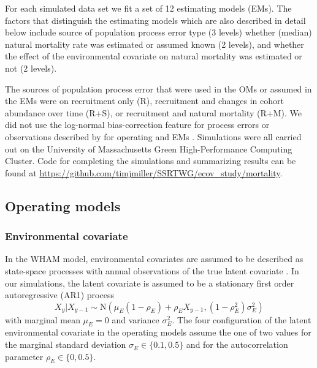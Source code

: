 \documentclass[
  12pt,
]{article}
\begin{document}
For each simulated data set we fit a set of 12 estimating models (EMs). The factors that distinguish the estimating models which are also described in detail below include source of population process error type (3 levels) whether (median) natural mortality rate was estimated or assumed known (2 levels), and whether the effect of the environmental covariate on natural mortality was estimated or not (2 levels).

The sources of population process error that were used in the OMs or assumed in the EMs were on recruitment only (R), recruitment and changes in cohort abundance over time (R+S), or recruitment and natural mortality (R+M). We did not use the log-normal bias-correction feature for process errors or observations described by \citet{stockmiller21} for operating and EMs \citep{lietal_inreview}. Simulations were all carried out on the University of Massachusetts Green High-Performance Computing Cluster. Code for completing the simulations and summarizing results can be found at \url{https://github.com/timjmiller/SSRTWG/ecov_study/mortality}.

\hypertarget{operating-models}{%
\subsection*{Operating models}\label{operating-models}}

\hypertarget{environmental-covariate}{%
\subsubsection*{Environmental covariate}\label{environmental-covariate}}

In the WHAM model, environmental covariates are assumed to be described as state-space processes with annual observations of the true latent covariate \citep{milleretal16, stockmiller21}. In our simulations, the latent covariate is assumed to be a stationary first order autoregressive (AR1) process
\[
X_y|X_{y-1} \sim \text{N}\left(\mu_E\left(1-\rho_E\right) + \rho_E X_{y-1}, \left(1-\rho_E^2\right)\sigma^2_E\right)
\]
with marginal mean \(\mu_E=0\) and variance \(\sigma^2_E\). The four configuration of the latent environmental covariate in the operating models assume the one of two values for the marginal standard deviation \(\sigma_E \in \{0.1, 0.5\}\) and for the autocorrelation parameter \(\rho_E \in \{0, 0.5\}\).
\end{document}
